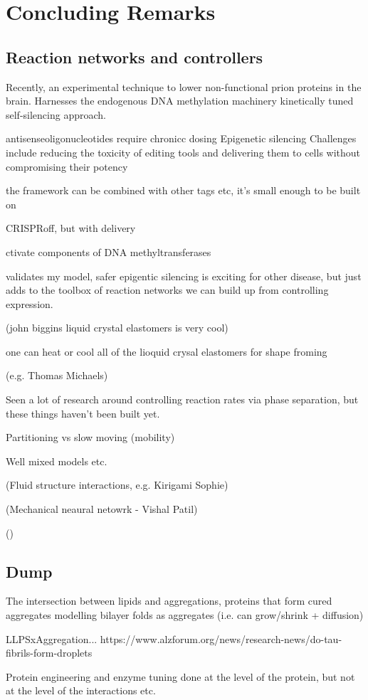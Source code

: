 \chapter{\label{ch:4-conc}Concluding Remarks} 

\minitoc

\newpage

\section{Reaction networks and controllers}

Recently, an experimental technique to lower non-functional prion proteins in the brain.
Harnesses the endogenous DNA methylation machinery
kinetically tuned self-silencing approach.

antisenseoligonucleotides require chronicc dosing
Epigenetic silencing
Challenges include reducing the toxicity of editing tools and delivering them to cells without compromising their potency

the framework can be combined with other tags etc, it's small enough to be built on

CRISPRoff, but with delivery

ctivate components of DNA methyltransferases

validates my model, safer epigentic silencing is exciting for other disease, but just adds to the toolbox of reaction networks we can build up from controlling expression.

(john biggins liquid crystal elastomers is very cool)

one can heat or cool all of the lioquid crysal elastomers for shape froming


(e.g. Thomas Michaels)

Seen a lot of research around controlling reaction rates via phase separation, but these things haven't been built yet.

Partitioning vs slow moving (mobility)

Well mixed models etc.

(Fluid structure interactions, e.g. Kirigami Sophie)

(Mechanical neaural netowrk - Vishal Patil)

()

\section{Dump}

The intersection between lipids and aggregations,
proteins that form cured aggregates
modelling bilayer folds as aggregates (i.e. can grow/shrink + diffusion)



LLPSxAggregation... https://www.alzforum.org/news/research-news/do-tau-fibrils-form-droplets



Protein engineering and enzyme tuning done at the level of the protein, but not at the level of the interactions etc.